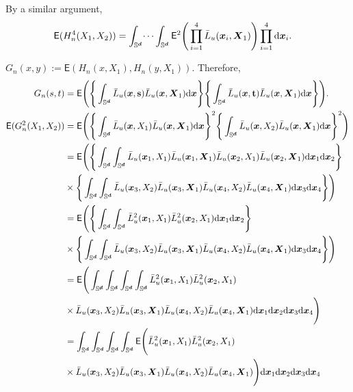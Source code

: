\documentclass{article}
\begin{document}
By a similar argument,
\begin{align*}
    \mathsf{E} (H_n^4(X_1,X_2)) &= \int_{\Sr} \dots \int_{\Sr} \mathsf{E}^2 \Bigg( \prod_{i=1}^{4} \bar{L}_u (\bx_i,\bX_1)  \Bigg) \prod_{i=1}^{4} \mathrm{d} \bx_i.
\end{align*}

$G_n(x,y) := \mathsf{E} (H_n(x,X_1),H_n(y,X_1))$. Therefore,
\begin{align*}
    G_n(s,t) &= \mathsf{E} \Bigg( \Bigg\{ \int_{\Sr} \bar{L}_u (\bx,\mathbf{s}) \bar{L}_u (\bx,\bX_1) \mathrm{d} \bx \Bigg\} \Bigg\{ \int_{\Sr} \bar{L}_u (\bx,\mathbf{t}) \bar{L}_u (\bx,\bX_1) \mathrm{d} \bx \Bigg\} \Bigg). \\
    \mathsf{E} (G_n^2(X_1,X_2)) &= \mathsf{E} \Bigg( \Bigg\{ \int_{\Sr} \bar{L}_u (\bx,X_1) \bar{L}_u (\bx,\bX_1) \mathrm{d} \bx \Bigg\}^2 \Bigg\{ \int_{\Sr} \bar{L}_u (\bx,X_2) \bar{L}_u (\bx,\bX_1) \mathrm{d} \bx \Bigg\}^2 \Bigg) \\
    &= \mathsf{E} \Bigg( \Bigg\{ \int_{\Sr} \int_{\Sr} \bar{L}_u (\bx_1,X_1) \bar{L}_u (\bx_1,\bX_1) \bar{L}_u (\bx_2,X_1) \bar{L}_u (\bx_2,\bX_1) \mathrm{d} \bx_1 \mathrm{d} \bx_2 \Bigg\} \\
    &\times \Bigg\{ \int_{\Sr} \int_{\Sr} \bar{L}_u (\bx_3,X_2) \bar{L}_u (\bx_3,\bX_1) \bar{L}_u (\bx_4,X_2) \bar{L}_u (\bx_4,\bX_1) \mathrm{d} \bx_3 \mathrm{d} \bx_4 \Bigg\} \Bigg) \\
    &= \mathsf{E} \Bigg( \Bigg\{ \int_{\Sr} \int_{\Sr} \bar{L}_u^2 (\bx_1,X_1) \bar{L}_u^2 (\bx_2,X_1) \mathrm{d} \bx_1 \mathrm{d} \bx_2 \Bigg\} \\
    &\times \Bigg\{ \int_{\Sr} \int_{\Sr} \bar{L}_u (\bx_3,X_2) \bar{L}_u (\bx_3,\bX_1) \bar{L}_u (\bx_4,X_2) \bar{L}_u (\bx_4,\bX_1) \mathrm{d} \bx_3 \mathrm{d} \bx_4 \Bigg\} \Bigg) \\
    &= \mathsf{E} \Bigg( \int_{\Sr} \int_{\Sr} \int_{\Sr} \int_{\Sr} \bar{L}_u^2 (\bx_1,X_1) \bar{L}_u^2 (\bx_2,X_1)  \\
    &\times  \bar{L}_u (\bx_3,X_2) \bar{L}_u (\bx_3,\bX_1) \bar{L}_u (\bx_4,X_2) \bar{L}_u (\bx_4,\bX_1) \mathrm{d} \bx_1 \mathrm{d} \bx_2 \mathrm{d} \bx_3 \mathrm{d} \bx_4 \Bigg) \\
    &= \int_{\Sr} \int_{\Sr} \int_{\Sr} \int_{\Sr} \mathsf{E} \Bigg( \bar{L}_u^2 (\bx_1,X_1) \bar{L}_u^2 (\bx_2,X_1)  \\
    &\times  \bar{L}_u (\bx_3,X_2) \bar{L}_u (\bx_3,\bX_1) \bar{L}_u (\bx_4,X_2) \bar{L}_u (\bx_4,\bX_1) \Bigg) \mathrm{d} \bx_1 \mathrm{d} \bx_2 \mathrm{d} \bx_3 \mathrm{d} \bx_4
\end{align*}
\end{document}
